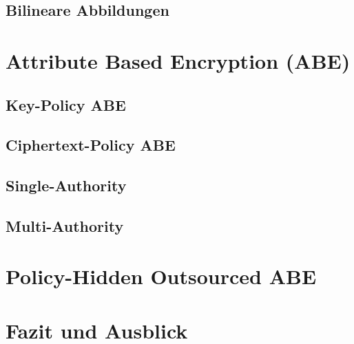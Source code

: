 \documentclass{hsflensburg}
\begin{document}
	\subsection{Bilineare Abbildungen}

	\section{Attribute Based Encryption (ABE)}
	\subsection{Key-Policy ABE}
	\subsection{Ciphertext-Policy ABE}
	\subsection{Single-Authority}
	\subsection{Multi-Authority}

	\section{Policy-Hidden Outsourced ABE}
	\section{Fazit und Ausblick}

	
	
\end{document}

